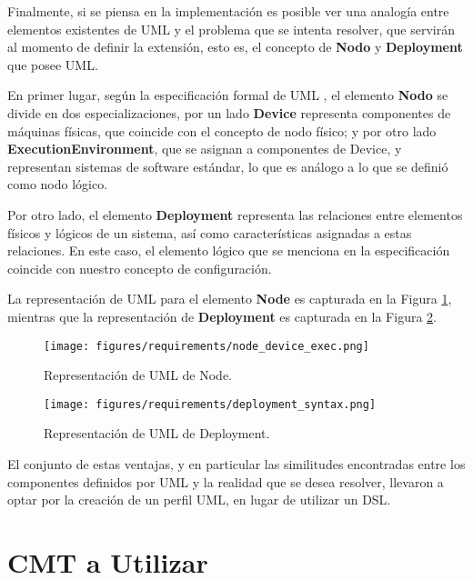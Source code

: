 Finalmente, si se piensa en la implementación es posible ver una analogía entre elementos existentes de UML y el problema que se intenta resolver, que servirán al momento de definir la extensión, esto es, el concepto de \textbf{Nodo} y \textbf{Deployment} que posee UML. 

En primer lugar, según la especificación formal de UML \cite{UML}, el elemento \textbf{Nodo} se divide en dos especializaciones, por un lado \textbf{Device} representa componentes de máquinas físicas, que coincide con el concepto de nodo físico; y por otro lado \textbf{ExecutionEnvironment}, que se asignan a componentes de Device, y representan sistemas de software estándar, lo que es análogo a lo que se definió como nodo lógico. 

Por otro lado, el elemento \textbf{Deployment} representa las relaciones entre elementos físicos y lógicos de un sistema, así como características asignadas a estas relaciones. En este caso, el elemento lógico que se menciona en la especificación coincide con nuestro concepto de configuración.

La representación de UML para el elemento \textbf{Node} es capturada en la Figura \ref{fig:requirements:uml_node}, mientras que la representación de \textbf{Deployment} es capturada en la Figura \ref{fig:requirements:uml_deployment}.

\begin{figure}[H]
    \centering
    \texttt{[image: figures/requirements/node\_device\_exec.png]}
    \caption{Representación de UML de Node. \cite{UML}}
    \label{fig:requirements:uml_node}
\end{figure}

\begin{figure}[H]
    \centering
    \texttt{[image: figures/requirements/deployment\_syntax.png]}
    \caption{Representación de UML de Deployment. \cite{UML}}
    \label{fig:requirements:uml_deployment}
\end{figure}


El conjunto de estas ventajas, y en particular las similitudes encontradas entre los componentes definidos por UML y la realidad que se desea resolver, llevaron a optar por la creación de un perfil UML, en lugar de utilizar un DSL.

\section{CMT a Utilizar}\label{CMT a utilizar}

